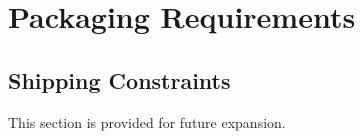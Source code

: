 \KNEADSECTIONNEWPAGE
\section{Packaging Requirements}
\label{lab:sec_Packaging}



\KNEADSUBSECTIONNEWPAGE
\subsection{Shipping Constraints}
\label{lab:ssec_Packaging_ShippingConstraints_CAP}

This section is provided for future expansion.

%
